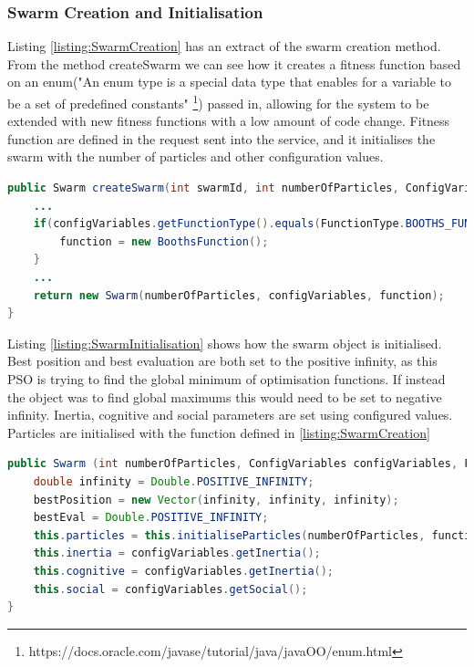 \documentclass[oneside,12pt]{book}
\begin{document}
\subsubsection{Swarm Creation and Initialisation}
Listing \ref{listing:SwarmCreation} has an extract of the swarm creation method. From the method createSwarm we can see how it creates a fitness function based on an enum("An enum type is a special data type that enables for a variable to be a set of predefined constants" \footnote{https://docs.oracle.com/javase/tutorial/java/javaOO/enum.html}) passed in, allowing for the system to be extended with new fitness functions with a low amount of code change. Fitness function are defined in the request sent into the service, and it initialises the swarm with the number of particles and other configuration values.

\begin{lstlisting}[basicstyle=\footnotesize, language=Java]
public Swarm createSwarm(int swarmId, int numberOfParticles, ConfigVariables configVariables) throws Exception {
    ...
    if(configVariables.getFunctionType().equals(FunctionType.BOOTHS_FUNCTION)){
        function = new BoothsFunction();
    } 
    ...
    return new Swarm(numberOfParticles, configVariables, function);
}
\end{lstlisting}
\label{listing:SwarmCreation}

Listing \ref{listing:SwarmInitialisation} shows how the swarm object is initialised. Best position and best evaluation are both set to the positive infinity, as this PSO is trying to find the global minimum of optimisation functions. If instead the object was to find global maximums this would need to be set to negative infinity. Inertia, cognitive and social parameters are set using configured values. Particles are initialised with the function defined in \ref{listing:SwarmCreation}

\begin{lstlisting}[basicstyle=\footnotesize, language=Java]
public Swarm (int numberOfParticles, ConfigVariables configVariables, Function function) {
    double infinity = Double.POSITIVE_INFINITY;
    bestPosition = new Vector(infinity, infinity, infinity);
    bestEval = Double.POSITIVE_INFINITY;
    this.particles = this.initialiseParticles(numberOfParticles, function);
    this.inertia = configVariables.getInertia();
    this.cognitive = configVariables.getInertia();
    this.social = configVariables.getSocial();
}
\end{lstlisting}
\label{listing:SwarmInitialisation}
\end{document}
